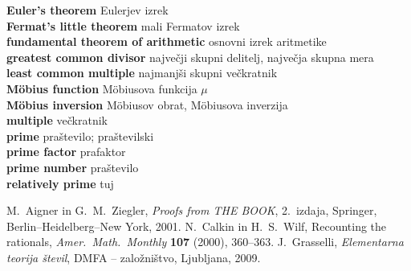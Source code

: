 \documentclass[a4paper,12pt]{article}
\newcommand{\geslo}[2]{\noindent\textbf{#1} \quad \hangindent=1cm #2\\[-1pc]}
\begin{document}
\geslo{Euler's theorem}{Eulerjev izrek}

\geslo{Fermat's little theorem}{mali Fermatov izrek}

\geslo{fundamental theorem of arithmetic}{osnovni izrek aritmetike}

\geslo{greatest common divisor}{največji skupni delitelj, največja skupna mera}

\geslo{least common multiple}{najmanjši skupni večkratnik}

\geslo{M\"obius function}{M\"obiusova funkcija $\mu$}

\geslo{M\"obius inversion}{M\"obiusov obrat, M\"obiusova inverzija}

\geslo{multiple}{večkratnik}

\geslo{prime}{praštevilo; praštevilski}

\geslo{prime factor}{prafaktor}

\geslo{prime number}{praštevilo}

\geslo{relatively prime}{tuj}




\begin{thebibliography}{1}
M.~Aigner in G.~M.~Ziegler, \emph{Proofs from THE BOOK}, 2.\ izdaja, Springer, Berlin--Heidelberg--New York, 2001.
N.~Calkin in H.~S.~Wilf, Recounting the rationals,
\emph{Amer.~Math.~Monthly}  \textbf{107}  (2000),  360--363.
J.~Grasselli, \emph{Elementarna teorija števil}, DMFA -- založništvo, Ljubljana, 2009.
\end{thebibliography}
\end{document}
